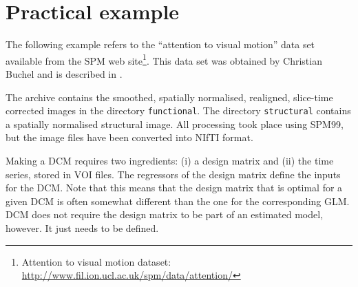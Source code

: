\section{Practical example}

The following example refers to the ``attention to visual motion'' data set available from the SPM web site\footnote{Attention to visual motion dataset: \url{http://www.fil.ion.ucl.ac.uk/spm/data/attention/}}. This data set was obtained by Christian Buchel and is described in \cite{buchel97}.

The archive contains the smoothed, spatially normalised, realigned, slice-time corrected images in the directory \texttt{functional}. The directory \texttt{structural} contains a spatially normalised structural image. All processing took place using SPM99, but the image files have been converted into NIfTI format.

Making a DCM requires two ingredients: (i) a design matrix and (ii) the time series, stored in VOI files.  The regressors of the design matrix define the inputs for the DCM.  Note that this means that the design matrix that is optimal for a given DCM is often somewhat different than the one for the corresponding GLM. DCM does not require the design matrix to be part of an estimated model, however. It just needs to be defined.

